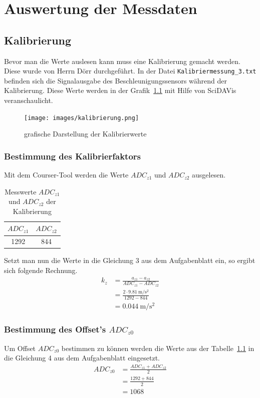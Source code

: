 \chapter{Auswertung der Messdaten}
    \section{Kalibrierung}
        Bevor man die Werte auslesen kann muss eine Kalibrierung gemacht werden. Diese wurde von Herrn Dörr durchgeführt. In der Datei \texttt{Kalibriermessung\_3.txt} 
        befinden sich die Signalausgabe des Beschleunigungssensors während der Kalibrierung.
        Diese Werte werden in der Grafik~\ref{kaligraf} mit Hilfe von SciDAVis veranschaulicht.\\
        \begin{figure}[ht!]
            \centering
            \texttt{[image: images/kalibrierung.png]}
            \caption{grafische Darstellung der Kalibrierwerte}
            \label{kaligraf}
        \end{figure}
        
        \subsection{Bestimmung des Kalibrierfaktors}
            Mit dem Courser-Tool werden die Werte \(ADC_{z1}\) und \(ADC_{z2}\) ausgelesen. 
            \begin{table}[!ht]
                \centering
                \caption{Messwerte \(ADC_{z1}\) und \(ADC_{z2}\) der Kalibrierung}
                \begin{tabular}{|c|c|}
                    \hline
                    \(ADC_{z1}\) & \(ADC_{z2}\)\\ \hline 
                    1292 & 844 \\ \hline
                \end{tabular}
                \label{kali}
            \end{table}
            Setzt man nun die Werte in die Gleichung 3 aus dem Aufgabenblatt ein, so ergibt sich folgende Rechnung.
            \begin{align*}
                k_z&=\frac{a_{z1}-a_{z2}}{ADC_{z1}-ADC_{z2}}\\
                &=\frac{2\cdot \SI{9.81}{\meter\per\square\second}}{1292-844}\\
                &=\SI{0,044}{\meter\per\square\second}
            \end{align*}
        \subsection{Bestimmung des Offset's $ADC_{z0}$}
            Um Offset \(ADC_{z0}\) bestimmen zu können werden die Werte aus der Tabelle~\ref{kali} in die Gleichung 4 aus dem Aufgabenblatt eingesetzt. 
            \begin{align*}
                ADC_{z0}&=\frac{ADC_{z1}+ADC_{z2}}{2}\\
                &=\frac{1292+844}{2}\\
                &=1068 
            \end{align*}
